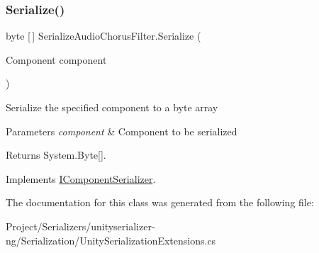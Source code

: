 \subsubsection{\texorpdfstring{Serialize()}{Serialize()}}
{\footnotesize\ttfamily byte \mbox{[}$\,$\mbox{]} Serialize\+Audio\+Chorus\+Filter.\+Serialize (\begin{DoxyParamCaption}\item[{Component}]{component }\end{DoxyParamCaption})\hspace{0.3cm}{\ttfamily [inline]}}



Serialize the specified component to a byte array 


\begin{DoxyParams}{Parameters}
{\em component} & Component to be serialized\\
\hline
\end{DoxyParams}
\begin{DoxyReturn}{Returns}
System.\+Byte\mbox{[}\mbox{]}.
\end{DoxyReturn}


Implements \hyperlink{interface_i_component_serializer_ab2aa38005665496b62d6c54b5f0dbd31}{I\+Component\+Serializer}.



The documentation for this class was generated from the following file\+:\begin{DoxyCompactItemize}
\item 
Project/\+Serializers/unityserializer-\/ng/\+Serialization/Unity\+Serialization\+Extensions.\+cs\end{DoxyCompactItemize}
